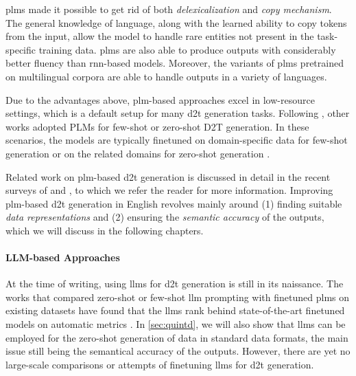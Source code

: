 {\acp{plm} made it possible to get rid of both \emph{delexicalization} and \emph{copy mechanism}. The general knowledge of language, along with the learned ability to copy tokens from the input, allow the model to handle rare entities not present in the task-specific training data. \acp{plm} are also able to produce outputs with considerably better fluency than \ac{rnn}-based models. Moreover, the variants of \acp{plm} pretrained on multilingual corpora \cite{liuMultilingualDenoisingPretraining2020,xueMT5MassivelyMultilingual2021} are able to handle outputs in a variety of languages.

Due to the advantages above, \ac{plm}-based approaches excel in low-resource settings, which is a default setup for many \ac{d2t} generation tasks. Following \citet{chenFewShotNLGPreTrained2019}, other works adopted PLMs for few-shot or zero-shot D2T generation. In these scenarios, the models are typically finetuned on domain-specific data for few-shot generation \cite{changNeuralDatatoTextGeneration2021,suFewShotTabletoTextGeneration2021} or on the related domains for zero-shot generation \cite{kasner2022neural,kasnerMindLabelsDescribing2022}.

Related work on \ac{plm}-based \ac{d2t} generation is discussed in detail in the recent surveys of \citet{sharmaInnovationsNeuralDatatotext2022} and \citet{lin2023survey}, to which we refer the reader for more information. Improving \ac{plm}-based \ac{d2t} generation in English revolves mainly around (1) finding suitable \emph{data representations} and (2) ensuring the \emph{semantic accuracy} of the outputs, which we will discuss in the following chapters.

\paragraph{LLM-based Approaches} At the time of writing, using \acp{llm} for \ac{d2t} generation is still in its naissance. The works that compared zero-shot or few-shot \ac{llm} prompting with finetuned \acp{plm} on existing datasets have found that the \acp{llm} rank behind state-of-the-art finetuned models on automatic metrics \cite{axelssonUsingLargeLanguage2023,yuanEvaluatingGenerativeModels2023}. In \autoref{sec:quintd}, we will also show that \acp{llm} can be employed for the zero-shot generation of data in standard data formats, the main issue still being the semantical accuracy of the outputs. However, there are yet no large-scale comparisons or attempts of finetuning \acp{llm} for \ac{d2t} generation.

}
